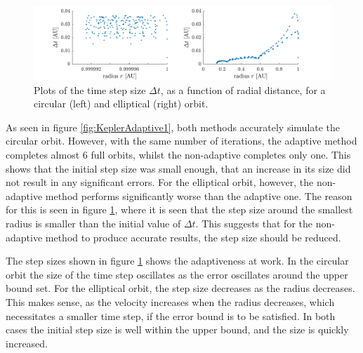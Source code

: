 \documentclass[a4paper,10pt]{article} 	%
\numberwithin{equation}{section}
\begin{document}
	\begin{figure}[H]
		\centering
		\includegraphics[width = \linewidth]{aRK4DT.pdf}
		\caption{Plots of the time step size $ \Delta t $, as a function of radial distance, for a circular (left) and elliptical (right) orbit.}
		\label{fig:KeplerAdaptiveDT}
	\end{figure}
	As seen in figure \ref{fig:KeplerAdaptive1}, both methods accurately simulate the circular orbit. However, with the same number of iterations, the adaptive method completes almost 6 full orbits, whilst the non-adaptive completes only one. This shows that the initial step size was small enough, that an increase in its size did not result in any significant errors. For the elliptical orbit, however, the non-adaptive method performs significantly worse than the adaptive one. The reason for this is seen in figure \ref{fig:KeplerAdaptiveDT}, where it is seen that the step size around the smallest radius is smaller than the initial value of $ \Delta t $. This suggests that for the non-adaptive method to produce accurate results, the step size should be reduced.
	
	The step sizes shown in figure \ref{fig:KeplerAdaptiveDT} shows the adaptiveness at work. In the circular orbit the size of the time step oscillates as the error oscillates around the upper bound set. For the elliptical orbit, the step size decreases as the radius decreases. This makes sense, as the velocity increases when the radius decreases, which necessitates a smaller time step, if the error bound is to be satisfied. In both cases the initial step size is well within the upper bound, and the size is quickly increased.
	
	
\end{document}
